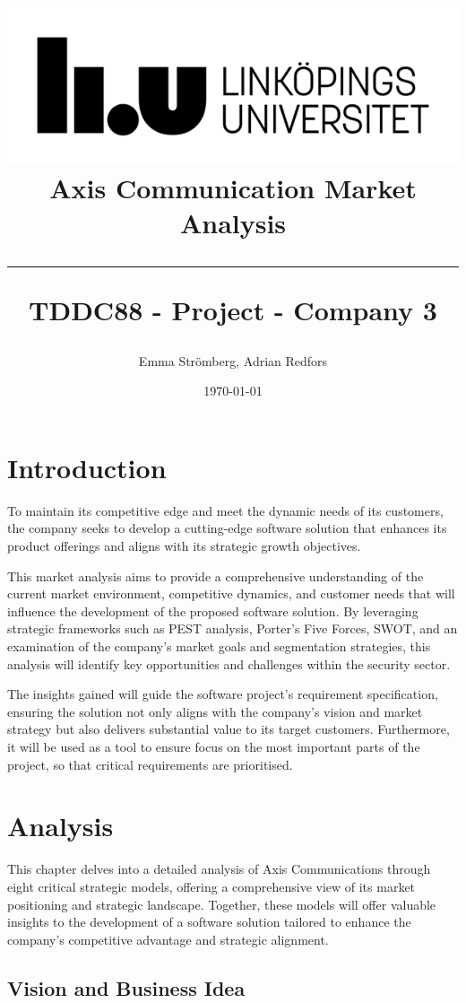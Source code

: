 \documentclass{article}
\title{
\includegraphics[scale=1.5]{liu_logga.png} \\
\vspace{2.0cm} \textbf{Axis Communication Market Analysis} \\
 \endgraf\rule{\textwidth}{.4pt}
  \large \textbf{TDDC88 - Project - Company 3}\\
   }
\author{Emma Strömberg, Adrian Redfors}
\date{\today}
\begin{document}
\maketitle


\newpage
\tableofcontents
\newpage

\section{Introduction}
 To maintain its competitive edge and meet the dynamic needs of its customers, the company seeks to develop a cutting-edge software solution that enhances its product offerings and aligns with its strategic growth objectives.

This market analysis aims to provide a comprehensive understanding of the current market environment, competitive dynamics, and customer needs that will influence the development of the proposed software solution. By leveraging strategic frameworks such as PEST analysis, Porter’s Five Forces, SWOT, and an examination of the company’s market goals and segmentation strategies, this analysis will identify key opportunities and challenges within the security sector. 

The insights gained will guide the software project’s requirement specification, ensuring the solution not only aligns with the company’s vision and market strategy but also delivers substantial value to its target customers. Furthermore, it will be used as a tool to ensure focus on the most important parts of the project, so that critical requirements are prioritised. 


\newpage
\section{Analysis}
This chapter delves into a detailed analysis of Axis Communications through eight critical strategic models, offering a comprehensive view of its market positioning and strategic landscape. Together, these models will offer valuable insights to the development of a software solution tailored to enhance the company's competitive advantage and strategic alignment.



\subsection{Vision and Business Idea}
\end{document}

